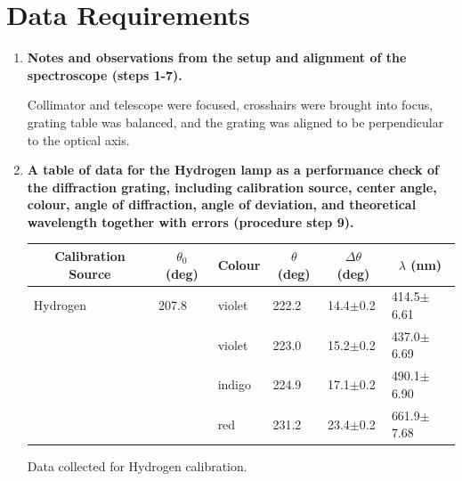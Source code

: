 \section{Data Requirements}
\begin{enumerate}

\item {\bf Notes and observations from the setup and alignment of the spectroscope (steps 1-7).}\newline

Collimator and telescope were focused, crosshairs were brought into focus, grating table was balanced, and the grating was aligned to be perpendicular to the optical axis.

\item {\bf A table of data for the Hydrogen lamp as a performance check of the diffraction grating, including calibration source, center angle, colour, angle of diffraction, angle of deviation, and theoretical wavelength together with errors (procedure step 9).}\newline

\begin{maintable}[ht]
\begin{tabular}{|l|l|l|l|l|l|}
\hline
\multicolumn{1}{|c|}{Calibration Source} & \multicolumn{1}{c|}{$\theta_0$ (deg)} & \multicolumn{1}{c|}{Colour} & \multicolumn{1}{c|}{$\theta$ (deg)} & \multicolumn{1}{c|}{$\Delta\theta$ (deg)} & \multicolumn{1}{c|}{$\lambda$ (nm)} \\ \hline
Hydrogen                                 & 207.8                                 & violet                      & 222.2                               & 14.4$\pm$0.2                              & 414.5$\pm$6.61                      \\ \hline
                                         &                                       & violet                      & 223.0                               & 15.2$\pm$0.2                              & 437.0$\pm$6.69                      \\ \hline
                                         &                                       & indigo                      & 224.9                               & 17.1$\pm$0.2                              & 490.1$\pm$6.90                      \\ \hline
                                         &                                       & red                         & 231.2                               & 23.4$\pm$0.2                              & 661.9$\pm$7.68                      \\ \hline
\end{tabular}
\caption{Data collected for Hydrogen calibration.}
\label{tab:spcg2}
\end{maintable}


\end{enumerate}
